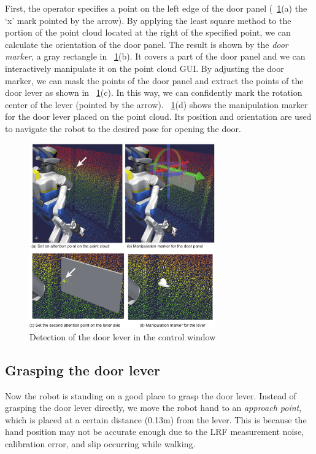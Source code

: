 First, the operator specifies a point on the left edge of the door panel
(\figurename~\ref{fig:door_manip_markers}(a) the `x' mark pointed by the arrow).
By applying the least square method to the portion of the point cloud located at the right of
the specified point, we can calculate the orientation of the door panel.
The result is shown by the {\it door marker}, a gray rectangle in
\figurename~\ref{fig:door_manip_markers}(b).
It covers a part of the door panel and we can interactively manipulate it on the point cloud GUI.
By adjusting the door marker, we can mask the points of the door panel and extract the points of
the door lever as shown in \figurename~\ref{fig:door_manip_markers}(c).
In this way, we can confidently mark the rotation center of the lever (pointed by the arrow).
\figurename~\ref{fig:door_manip_markers}(d) shows the manipulation marker for the door lever
placed on the point cloud.
Its position and orientation are used to navigate the robot to the desired pose for opening
the door.

\begin{figure}[t]
  \centering
  \includegraphics[width = 8cm]{img/door_manipulation_markers}
  \caption{Detection of the door lever in the control window}
  \label{fig:door_manip_markers}
\end{figure}

\subsection{Grasping the door lever}
%
Now the robot is standing on a good place to grasp the door lever.
Instead of grasping the door lever directly, we move the robot hand to an {\it approach point},
which is placed at a certain distance (0.13m) from the lever. 
This is because the hand position may not be accurate enough due to the LRF measurement noise,
calibration error, and slip occurring while walking.

